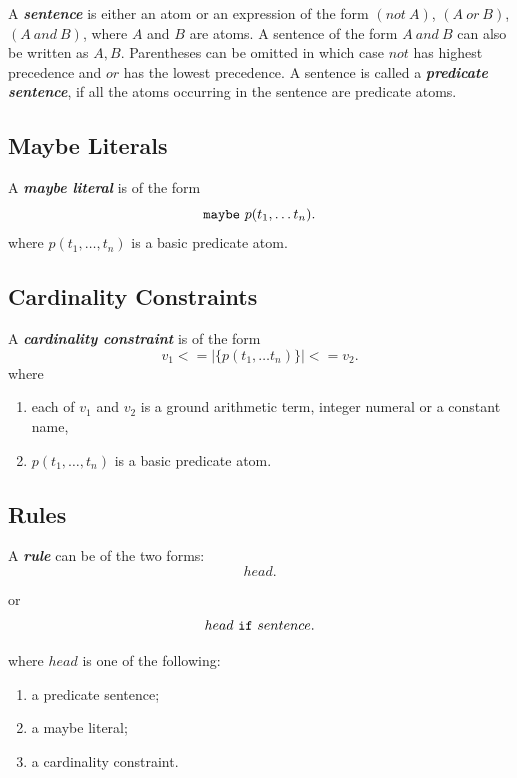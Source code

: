 \documentclass[a4paper,10pt]{article}
\begin{document}
A \textit{\textbf{sentence}} is either an atom or an expression of the form $(not~A)$, $(A~or~B)$, $(A~and~B)$, where $A$ and $B$ are atoms. A sentence of the form $A~and~B$
can also be written as $A, B$. Parentheses can be omitted in which case $not$ has highest precedence and $or$ has the lowest precedence. A sentence is called a \textbf{\textit{predicate sentence}}, if all the atoms occurring in the sentence are predicate atoms.

\subsection{Maybe Literals}

A \textbf{\textit{maybe literal}} is of the form $$\mbox{\texttt{maybe}}~p(t_1,\ldots t_n).$$ where $p(t_1,\ldots,t_n)$ is a basic predicate atom.

\subsection{Cardinality Constraints}

A \textit{\textbf{cardinality constraint}} is of the form 
$$v_1 <= |\{p(t_1,\ldots t_n)\}| <= v_2.$$
where
\begin{enumerate}
\item each of $v_1$ and $v_2$ is a ground arithmetic term, integer numeral or a constant name, 
\item $p(t_1,\ldots,t_n)$ is a basic predicate atom.
\end{enumerate}
\subsection{Rules} \label{rl}

A \textit{\textbf{rule}} can be of the two forms:
\begin{equation}\label{eq1}
  head. 
\end{equation}

\noindent
or 
\begin{equation}
head~\mbox{\texttt{if}}~sentence.
\end{equation}

\noindent
where $head$ is one of the following:
\begin{enumerate}
\item  a predicate sentence;
\item  a maybe literal;
\item  a cardinality constraint.
\end{enumerate}
\end{document}
